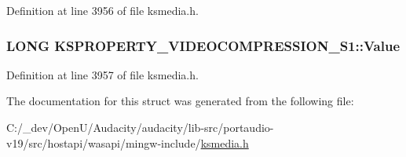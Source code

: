 Definition at line 3956 of file ksmedia.\+h.

\subsubsection[{\texorpdfstring{Value}{Value}}]{\setlength{\rightskip}{0pt plus 5cm}L\+O\+NG K\+S\+P\+R\+O\+P\+E\+R\+T\+Y\+\_\+\+V\+I\+D\+E\+O\+C\+O\+M\+P\+R\+E\+S\+S\+I\+O\+N\+\_\+\+S1\+::\+Value}\hypertarget{struct_k_s_p_r_o_p_e_r_t_y___v_i_d_e_o_c_o_m_p_r_e_s_s_i_o_n___s1_adcc9f8628c882d79a8bfafc50d2002e9}{}\label{struct_k_s_p_r_o_p_e_r_t_y___v_i_d_e_o_c_o_m_p_r_e_s_s_i_o_n___s1_adcc9f8628c882d79a8bfafc50d2002e9}


Definition at line 3957 of file ksmedia.\+h.



The documentation for this struct was generated from the following file\+:\begin{DoxyCompactItemize}
\item 
C\+:/\+\_\+dev/\+Open\+U/\+Audacity/audacity/lib-\/src/portaudio-\/v19/src/hostapi/wasapi/mingw-\/include/\hyperlink{ksmedia_8h}{ksmedia.\+h}\end{DoxyCompactItemize}

